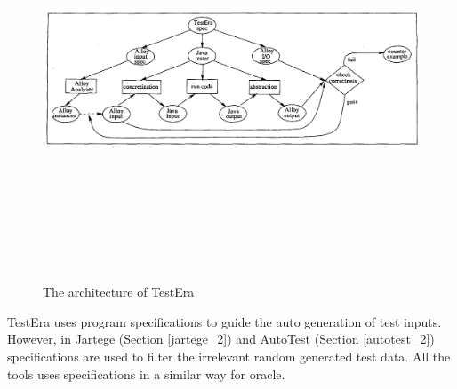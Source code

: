\begin{figure}[h]
	\centering
	\includegraphics[width=14.9cm, height=12cm]{chapter2/testera.png}
	\caption{The architecture of TestEra ~\cite{marinov2001testera}}
	\label{fig:testera}
\end{figure}


TestEra uses program specifications to guide the auto generation of test inputs. However, in Jartege (Section \ref{jartege_2}) and AutoTest (Section \ref{autotest_2}) specifications are used to filter the irrelevant random generated test data. All the tools uses specifications in a similar way for oracle. 



